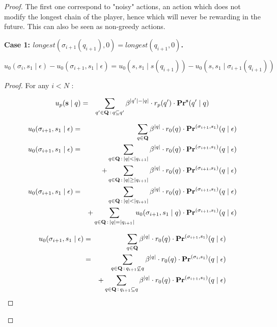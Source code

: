 \documentclass[11pt]{article}
\begin{document}
\begin{proof}
\bigskip
The first one correspond to "noisy" actions, an action which does not modify the longest chain of the player, hence which will never be rewarding in the future. This can also be seen as non-greedy actions.

\textbf{Case 1: $longest(\sigma_{i+1}(q_{i+1}),0) = longest(q_{i+1},0)$.}

\begin{mylem}
\label{lemdif}
$u_0(\sigma_i,s_1 \mid \epsilon) - u_0(\sigma_{i+1},s_1 \mid \epsilon) = u_0(s,s_1 \mid s(q_{i+1})) - u_0(s,s_1 \mid \sigma_{i+1}(q_{i+1}))$
\end{mylem}
\begin{proof}
\iffalse
For any $i < N$ :

\begin{eqnarray*}
u_p(\mathbf{s} \mid q) & = & \sum_{q' \in \mathbf{Q} \,:\, q \subseteq q'} \beta^{|q'|-|q|} \cdot  r_p(q') \cdot \mathbf{Pr}^{\mathbf{s}}(q' \mid q)
\end{eqnarray*}

\begin{eqnarray*}
u_0(\sigma_{i+1},s_1 \mid \epsilon) & = & \sum_{q \in \mathbf{Q}} \beta^{|q|} \cdot  r_0(q) \cdot \mathbf{Pr}^{(\sigma_{i+1},s_1)}(q \mid \epsilon)\\
u_0(\sigma_{i+1},s_1 \mid \epsilon) & = & \sum_{q \in \mathbf{Q} \,:\, |q| < |q_{i+1}| } \beta^{|q|} \cdot  r_0(q) \cdot \mathbf{Pr}^{(\sigma_{i+1},s_1)}(q \mid \epsilon)\\
& & + \sum_{q \in \mathbf{Q} \,:\, |q| \geq |q_{i+1}| } \beta^{|q|} \cdot  r_0(q) \cdot \mathbf{Pr}^{(\sigma_{i+1},s_1)}(q \mid \epsilon)\\
u_0(\sigma_{i+1},s_1 \mid \epsilon) & = & \sum_{q \in \mathbf{Q} \,:\, |q| < |q_{i+1}| } \beta^{|q|} \cdot  r_0(q) \cdot \mathbf{Pr}^{(\sigma_{i+1},s_1)}(q \mid \epsilon)\\
& & + \sum_{q \in \mathbf{Q} \,:\, |q| = |q_{i+1}| } u_0(\sigma_{i+1},s_1 \mid q) \cdot \mathbf{Pr}^{(\sigma_{i+1},s_1)}(q \mid \epsilon)\\
\end{eqnarray*}

\begin{eqnarray*}
u_0(\sigma_{i+1},s_1 \mid \epsilon) & = & \sum_{q \in \mathbf{Q}} \beta^{|q|} \cdot  r_0(q) \cdot \mathbf{Pr}^{(\sigma_{i+1},s_1)}(q \mid \epsilon)\\
& = & \sum_{q \in \mathbf{Q} \,:\, q_{i+1} \not \subseteq q} \beta^{|q|} \cdot  r_0(q) \cdot \mathbf{Pr}^{(\sigma_{i},s_1)}(q \mid \epsilon) \\
&  & +  \sum_{q \in \mathbf{Q} \,:\, q_{i+1} \subseteq q} \beta^{|q|} \cdot  r_0(q) \cdot \mathbf{Pr}^{(\sigma_{i+1},s_1)}(q \mid \epsilon) \\
\end{eqnarray*}


\end{proof}
\end{proof}
\end{document}
